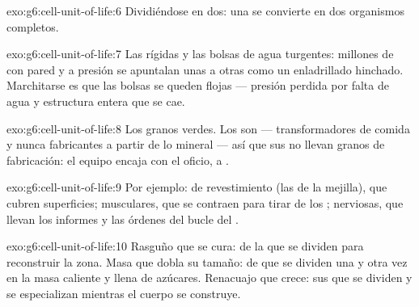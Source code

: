 \begin{solution}{exo:g6:cell-unit-of-life:6}
Dividiéndose en dos: una  se convierte en dos organismos
completos.
\end{solution}

\begin{solution}{exo:g6:cell-unit-of-life:7}
Las  rígidas y las bolsas de agua turgentes: millones
de  con pared y a presión se apuntalan unas a otras como un
enladrillado hinchado. Marchitarse es que las bolsas se queden flojas
--- presión perdida por falta de agua y estructura entera que se cae.
\end{solution}

\begin{solution}{exo:g6:cell-unit-of-life:8}
Los granos verdes. Los  son  --- transformadores de
 comida y nunca fabricantes a partir de lo mineral ---
así que sus  no llevan granos de fabricación: el equipo encaja
con el oficio,  a .
\end{solution}

\begin{solution}{exo:g6:cell-unit-of-life:9}
Por ejemplo:  de revestimiento (las de la mejilla), que cubren
superficies;  musculares, que se contraen para tirar de los
;  nerviosas, que llevan los informes y las órdenes del
bucle del .
\end{solution}

\begin{solution}{exo:g6:cell-unit-of-life:10}
Rasguño que se cura:  de la  que se dividen para
reconstruir la zona. Masa que dobla su tamaño:  de  que
se dividen una y otra vez en la masa caliente y llena de azúcares.
Renacuajo que crece: sus  que se dividen y se especializan
mientras el cuerpo se construye.
\end{solution}

